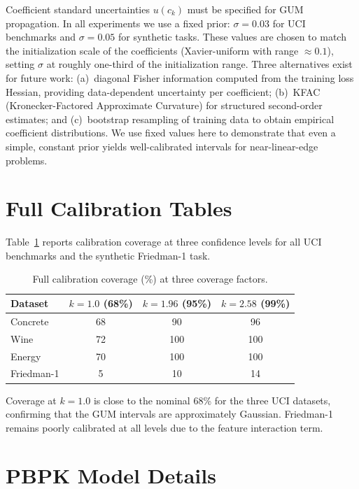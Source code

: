 \documentclass{article}
\begin{document}
Coefficient standard uncertainties $u(c_k)$ must be specified for GUM
propagation.  In all experiments we use a fixed prior: $\sigma = 0.03$ for
UCI benchmarks and $\sigma = 0.05$ for synthetic tasks.  These values are
chosen to match the initialization scale of the coefficients (Xavier-uniform
with range $\approx 0.1$), setting $\sigma$ at roughly one-third of the
initialization range.  Three alternatives exist for future work:
(a)~diagonal Fisher information computed from the training loss Hessian,
providing data-dependent uncertainty per coefficient; (b)~KFAC
(Kronecker-Factored Approximate Curvature) for structured second-order
estimates; and (c)~bootstrap resampling of training data to obtain empirical
coefficient distributions.  We use fixed values here to demonstrate that
even a simple, constant prior yields well-calibrated intervals for
near-linear-edge problems.

\section{Full Calibration Tables}
\label{app:calibration}

Table~\ref{tab:full-cal} reports calibration coverage at three confidence
levels for all UCI benchmarks and the synthetic Friedman-1 task.

\begin{table}[h]
\centering
\caption{Full calibration coverage (\%) at three coverage factors.}
\label{tab:full-cal}
\begin{tabular}{@{}lccc@{}}
\toprule
\textbf{Dataset} & $k{=}1.0$ (68\%) & $k{=}1.96$ (95\%) & $k{=}2.58$ (99\%) \\
\midrule
Concrete   & 68 &  90 &  96 \\
Wine       & 72 & 100 & 100 \\
Energy     & 70 & 100 & 100 \\
Friedman-1 &  5 &  10 &  14 \\
\bottomrule
\end{tabular}
\end{table}

Coverage at $k{=}1.0$ is close to the nominal 68\% for the three UCI
datasets, confirming that the GUM intervals are approximately Gaussian.
Friedman-1 remains poorly calibrated at all levels due to the feature
interaction term.

\section{PBPK Model Details}
\label{app:pbpk}
\end{document}
